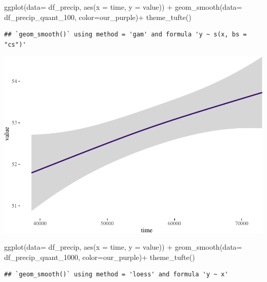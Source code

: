 \documentclass[
  paper=a4,
  ,captions=tableheading
]{scrartcl}
\newenvironment{Shaded}{\begin{snugshade}}{\end{snugshade}}
\newcommand{\AttributeTok}[1]{\textcolor[rgb]{0.77,0.63,0.00}{#1}}
\newcommand{\FunctionTok}[1]{\textcolor[rgb]{0.00,0.00,0.00}{#1}}
\newcommand{\NormalTok}[1]{#1}
\newcommand{\SpecialCharTok}[1]{\textcolor[rgb]{0.00,0.00,0.00}{#1}}
\begin{document}
\begin{Shaded}
\begin{Highlighting}[]
\FunctionTok{ggplot}\NormalTok{(}\AttributeTok{data=}\NormalTok{ df\_precip, }\FunctionTok{aes}\NormalTok{(}\AttributeTok{x =}\NormalTok{ time, }\AttributeTok{y =}\NormalTok{ value)) }\SpecialCharTok{+} 
     \FunctionTok{geom\_smooth}\NormalTok{(}\AttributeTok{data=}\NormalTok{ df\_precip\_quant\_100, }\AttributeTok{color=}\NormalTok{our\_purple)}\SpecialCharTok{+}
  \FunctionTok{theme\_tufte}\NormalTok{() }
\end{Highlighting}
\end{Shaded}

\begin{verbatim}
## `geom_smooth()` using method = 'gam' and formula 'y ~ s(x, bs = "cs")'
\end{verbatim}

\includegraphics{Haskell_files/figure-latex/unnamed-chunk-49-7.pdf}

\begin{Shaded}
\begin{Highlighting}[]
\FunctionTok{ggplot}\NormalTok{(}\AttributeTok{data=}\NormalTok{ df\_precip, }\FunctionTok{aes}\NormalTok{(}\AttributeTok{x =}\NormalTok{ time, }\AttributeTok{y =}\NormalTok{ value)) }\SpecialCharTok{+} 
     \FunctionTok{geom\_smooth}\NormalTok{(}\AttributeTok{data=}\NormalTok{ df\_precip\_quant\_1000, }\AttributeTok{color=}\NormalTok{our\_purple)}\SpecialCharTok{+}
  \FunctionTok{theme\_tufte}\NormalTok{()}
\end{Highlighting}
\end{Shaded}

\begin{verbatim}
## `geom_smooth()` using method = 'loess' and formula 'y ~ x'
\end{verbatim}
\end{document}
